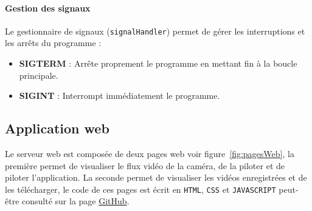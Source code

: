 \documentclass[a4paper, 11pt, french]{article}
\begin{document}
\paragraph{Gestion des signaux}
Le gestionnaire de signaux (\texttt{signalHandler}) permet de gérer les interruptions et les arrêts du programme :
\begin{itemize}
    \item \textbf{SIGTERM} : Arrête proprement le programme en mettant fin à la boucle principale.
    \item \textbf{SIGINT} : Interrompt immédiatement le programme.
\end{itemize}


\subsection{Application web}
Le serveur web est composée de deux pages web voir figure~\ref{fig:pagesWeb}, la première permet de visualiser le flux vidéo de la caméra, de la piloter et de piloter l'application. La seconde permet de visualiser les vidéos enregistrées et de les télécharger, le code de ces pages est écrit en \texttt{HTML}, \texttt{CSS} et \texttt{JAVASCRIPT} peut-être consulté sur la page \href{https://github.com/Romaiiin91/suiviGrimpeur_PDI/tree/main/server/html}{GitHub}.
\end{document}
